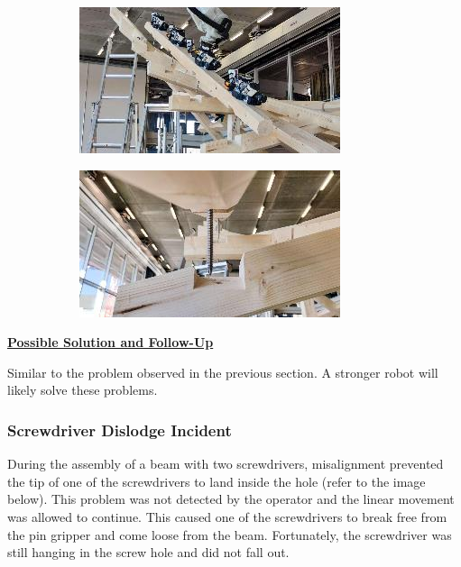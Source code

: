 \documentclass[11pt]{book}
\begin{document}
\begin{figure}[H]
\centering
\begin{subfigure}[b]{0.45\textwidth}
\centering
\includegraphics[width=\textwidth]{./images/image99.jpeg}
\end{subfigure}
\hfill
\begin{subfigure}[b]{0.45\textwidth}
\centering
\includegraphics[width=\textwidth]{./images/image100.jpeg}
\end{subfigure}
\end{figure}


\textbf{\uline{Possible Solution and Follow-Up}}

Similar to the problem observed in the previous section. A stronger robot will likely solve these problems.

\subsubsection{Screwdriver Dislodge Incident}

During the assembly of a beam with two screwdrivers, misalignment prevented the tip of one of the screwdrivers to land inside the hole (refer to the image below). This problem was not detected by the operator and the linear movement was allowed to continue. This caused one of the screwdrivers to break free from the pin gripper and come loose from the beam. Fortunately, the screwdriver was still hanging in the screw hole and did not fall out.
\end{document}
